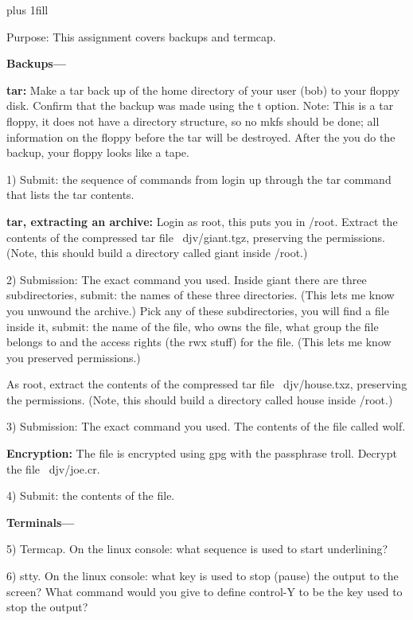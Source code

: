 
\rightskip=0pt plus 1fill

\parindent 0pt

Purpose: This assignment covers backups and termcap.

{\bf Backups---}

{\bf tar:}
Make a tar back up of the home directory of your user (bob) to your floppy
disk.
Confirm that the backup was made using the {\ltt{}t} option.
Note: This is a tar floppy, it does not have a directory structure,
so no mkfs should be done; all information on the floppy before
the tar will be destroyed. After the you do the backup, your
floppy looks like a tape.

1) Submit: the sequence of commands from login up through the
tar command that lists the tar contents.

{\bf tar, extracting an archive:}
Login as root, this puts you in {\ltt{}/root}.
Extract the contents of the compressed tar file {\ltt{}~djv/giant.tgz},
preserving the permissions.
(Note, this should build a directory called {\ltt{}giant} inside {\ltt{}/root}.)

2) Submission: The exact command you used.
Inside {\ltt{}giant} there are three subdirectories, submit: the names of
these three directories. (This lets me know you unwound the archive.)
Pick any of these subdirectories, you will find a file inside it,
submit: the name of the file, who owns the file, what group the file
belongs to and the access rights (the {\ltt{}rwx} stuff) for the file.
(This lets me know you preserved permissions.)

As root,
extract the contents of the compressed tar file {\ltt{}~djv/house.txz},
preserving the permissions.
(Note, this should build a directory called {\ltt{}house} inside {\ltt{}/root}.)

3) Submission: The exact command you used. The contents
of the file called {\ltt{}wolf}.

{\bf Encryption:}
The file is encrypted using gpg with the passphrase {\ltt{}troll}.
Decrypt the file {\ltt{}~djv/joe.cr}.

4) Submit: the contents of the file.


{\bf Terminals---}

5) Termcap.
On the linux console: what sequence is used to 
start underlining?

6) stty.
On the linux console: what key is used to stop (pause) the output to the
screen?
What command would you give to define control-Y to be the key used
to stop the output?

\bye
